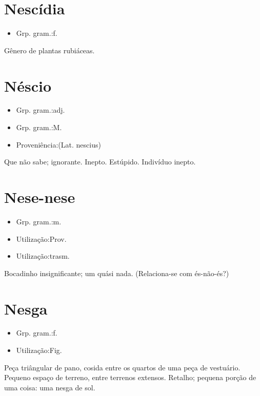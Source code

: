 \section{Nescídia}
\begin{itemize}
\item {Grp. gram.:f.}
\end{itemize}
Gênero de plantas rubiáceas.
\section{Néscio}
\begin{itemize}
\item {Grp. gram.:adj.}
\end{itemize}
\begin{itemize}
\item {Grp. gram.:M.}
\end{itemize}
\begin{itemize}
\item {Proveniência:(Lat. \textunderscore nescius\textunderscore )}
\end{itemize}
Que não sabe; ignorante.
Inepto.
Estúpido.
Indivíduo inepto.
\section{Nese-nese}
\begin{itemize}
\item {Grp. gram.:m.}
\end{itemize}
\begin{itemize}
\item {Utilização:Prov.}
\end{itemize}
\begin{itemize}
\item {Utilização:trasm.}
\end{itemize}
Bocadinho insignificante; um quási nada.
(Relaciona-se com \textunderscore és-não-és\textunderscore ?)
\section{Nesga}
\begin{itemize}
\item {Grp. gram.:f.}
\end{itemize}
\begin{itemize}
\item {Utilização:Fig.}
\end{itemize}
Peça triângular de pano, cosida entre os quartos de uma peça de vestuário.
Pequeno espaço de terreno, entre terrenos extensos.
Retalho; pequena porção de uma coisa: \textunderscore uma nesga de sol\textunderscore .
